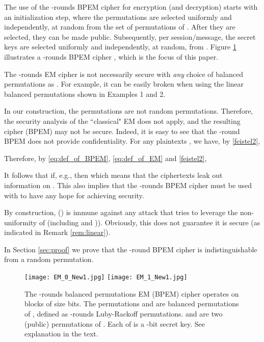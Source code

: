 \documentclass{llncs}
\begin{document}
The use of the -rounds BPEM cipher for encryption (and decryption) starts with an initialization step, where the permutations  are selected uniformly and independently, at random from the set of permutations of . After they are selected, they can be made public. Subsequently, per session/message, the secret keys  are selected uniformly and independently, at random, from . Figure \ref{2rEM} illustrates a -rounds BPEM cipher 
, which is the focus of this paper.

\begin{remark}
\label{rem:linear}
The -rounds EM cipher is not necessarily secure with {\it any} choice of balanced permutations as . For example, it can be easily broken when using the linear balanced permutations shown in Examples 1 and 2.
\end{remark}

\begin{remark}\label{rem:2LR}
In our construction, the permutations  are not random permutations. Therefore, the security analysis of the ``classical" EM does not apply, and the resulting cipher (BPEM) may not be secure. Indeed, it is easy to see that the -round BPEM does not provide confidentiality. For any plaintexts , we have, by \eqref{feistel2},

Therefore, by \eqref{eq:def_of_BPEM}, \eqref{eq:def_of_EM} and \eqref{feistel2},

It follows that if, e.g.,  then
 which means that the ciphertexts leak out information on .
This also implies that the -rounds BPEM cipher must be used with  to have any hope for achieving security.
\end{remark}

\begin{remark}\label{rem:immune}
By construction,  () is immune
against any attack that tries to leverage the non-uniformity of  (including \cite{NWW} and \cite{DDKS})). Obviously, this does not guarantee it is secure (as indicated in Remark \ref{rem:linear}).
\end{remark}

In Section \ref{sec:proof} we prove that the -round BPEM cipher is indistinguishable from a random permutation.

\begin{figure}[ht!]
\centering
\texttt{[image: EM\_0\_New1.jpg]}
\texttt{[image: EM\_1\_New1.jpg]}
\vspace{-1.5cm}
\caption{The -rounds balanced permutations EM (BPEM) cipher operates on blocks of size  bits.
The permutations  and  are balanced permutations of , defined as -rounds Luby-Rackoff permutations.  and  are two (public) permutations of .
Each of  is a -bit secret key. See explanation in the text.}
\label{2rEM}
\end{figure}
\end{document}
